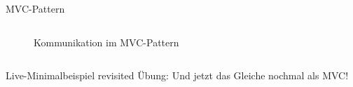 \documentclass[aspectratio=169,t]{beamer}
\begin{document}
\begin{frame}{MVC-Pattern}
\begin{columns}
\begin{column}{0.5\textwidth}
\begin{figure}
                \caption{Kommunikation im MVC-Pattern \cite{MVC}}
            \end{figure}
        \end{column}
    \end{columns}
\end{frame}


\begin{frame}{Live-Minimalbeispiel revisited}
    Übung: Und jetzt das Gleiche nochmal als MVC!
\end{frame}
\end{document}
